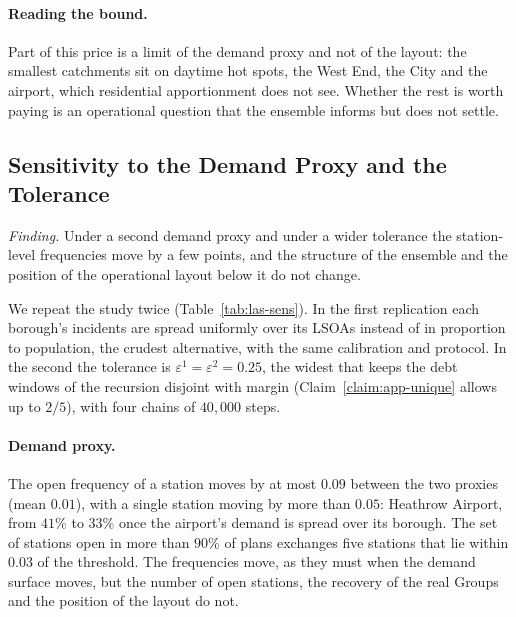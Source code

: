 \paragraph{Reading the bound.}
Part of this price is a limit of the demand proxy and not of the layout: the smallest catchments sit on daytime hot spots, the West End, the City and the airport, which residential apportionment does not see. Whether the rest is worth paying is an operational question that the ensemble informs but does not settle.

\subsection{Sensitivity to the Demand Proxy and the Tolerance}\label{sec:las-sensitivity}

\emph{Finding.} Under a second demand proxy and under a wider tolerance the station-level frequencies move by a few points, and the structure of the ensemble and the position of the operational layout below it do not change.

We repeat the study twice (Table~\ref{tab:las-sens}). In the first replication each borough's incidents are spread uniformly over its LSOAs instead of in proportion to population, the crudest alternative, with the same calibration and protocol. In the second the tolerance is $\varepsilon^1 = \varepsilon^2 = 0.25$, the widest that keeps the debt windows of the recursion disjoint with margin (Claim~\ref{claim:app-unique} allows up to $2/5$), with four chains of $40{,}000$ steps.

\begin{table}[!htbp]
\centering
\small
\resizebox{\linewidth}{!}{}
\caption{The London study under the baseline, under a uniform within-borough demand proxy, and under a tolerance of $0.25$. ``Outside every window'' counts the stations of the operational layout whose load lies outside the widest window of every capacity at the tolerance of the column.}
\label{tab:las-sens}
\end{table}

\paragraph{Demand proxy.}
The open frequency of a station moves by at most $0.09$ between the two proxies (mean $0.01$), with a single station moving by more than $0.05$: Heathrow Airport, from $41\%$ to $33\%$ once the airport's demand is spread over its borough. The set of stations open in more than $90\%$ of plans exchanges five stations that lie within $0.03$ of the threshold. The frequencies move, as they must when the demand surface moves, but the number of open stations, the recovery of the real Groups and the position of the layout do not.

